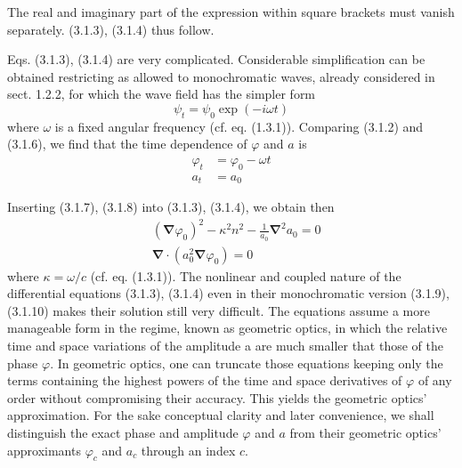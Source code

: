 \documentclass{article}
\begin{document}
The real and imaginary part of the expression within square brackets must vanish separately. (3.1.3), (3.1.4) thus follow.

Eqs. (3.1.3), (3.1.4) are very complicated. Considerable simplification can be obtained restricting as allowed to monochromatic waves, already considered in sect. 1.2.2, for which the wave field has the simpler form
$$
\begin{equation*}
\psi_{t}=\psi_{0} \exp (-i \omega t) \tag{3.1.6}
\end{equation*}
$$
where $\omega$ is a fixed angular frequency (cf. eq. (1.3.1)). Comparing (3.1.2) and (3.1.6), we find that the time dependence of $\varphi$ and $a$ is
$$
\begin{align*}
\varphi_{t} & =\varphi_{0}-\omega t  \tag{3.1.7}\\
a_{t} & =a_{0} \tag{3.1.8}
\end{align*}
$$

Inserting (3.1.7), (3.1.8) into (3.1.3), (3.1.4), we obtain then
$$
\begin{align*}
& \left(\boldsymbol{\nabla} \varphi_{0}\right)^{2}-\kappa^{2} n^{2}-\frac{1}{a_{0}} \boldsymbol{\nabla}^{2} a_{0}=0  \tag{3.1.9}\\
& \boldsymbol{\nabla} \cdot\left(a_{0}^{2} \boldsymbol{\nabla} \varphi_{0}\right)=0 \tag{3.1.10}
\end{align*}
$$
where $\kappa=\omega / c$ (cf. eq. (1.3.1)).
The nonlinear and coupled nature of the differential equations (3.1.3), (3.1.4)
even in their monochromatic version (3.1.9), (3.1.10) makes their solution still very difficult. The equations assume a more manageable form in the regime, known as geometric optics, in which the relative time and space variations of the amplitude a are much smaller that those of the phase $\varphi$. In geometric optics, one can truncate those equations keeping only the terms containing the highest powers of the time and space derivatives of $\varphi$ of any order without compromising their accuracy. This yields the geometric optics' approximation. For the sake conceptual clarity and later convenience, we shall distinguish the exact phase and amplitude $\varphi$ and $a$ from their geometric optics' approximants $\varphi_{c}$ and $a_{c}$ through an index $c$.
\end{document}
